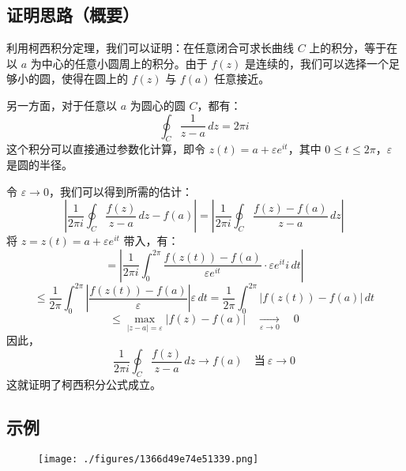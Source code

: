 \subsection{证明思路（概要）}
利用柯西积分定理，我们可以证明：在任意闭合可求长曲线 $C$ 上的积分，等于在以 $a$ 为中心的任意小圆周上的积分。由于 $f(z)$ 是连续的，我们可以选择一个足够小的圆，使得在圆上的 $f(z)$ 与 $f(a)$ 任意接近。

另一方面，对于任意以 $a$ 为圆心的圆 $C$，都有：
$$
\oint_{C} \frac{1}{z - a} \, dz = 2\pi i~
$$
这个积分可以直接通过参数化计算，即令 $z(t) = a + \varepsilon e^{it}$，其中 $0 \leq t \leq 2\pi$，$\varepsilon$ 是圆的半径。

令 $\varepsilon \to 0$，我们可以得到所需的估计：
$$
\left| \frac{1}{2\pi i} \oint_{C} \frac{f(z)}{z - a} \, dz - f(a) \right|
= \left| \frac{1}{2\pi i} \oint_{C} \frac{f(z) - f(a)}{z - a} \, dz \right|~
$$
将 $z = z(t) = a + \varepsilon e^{it}$ 带入，有：
$$
= \left| \frac{1}{2\pi i} \int_0^{2\pi} \frac{f(z(t)) - f(a)}{\varepsilon e^{it}} \cdot \varepsilon e^{it} i \, dt \right|~
$$
$$
\leq \frac{1}{2\pi} \int_0^{2\pi} \left| \frac{f(z(t)) - f(a)}{\varepsilon} \right| \varepsilon \, dt
= \frac{1}{2\pi} \int_0^{2\pi} |f(z(t)) - f(a)| \, dt~
$$
$$
\leq \max_{|z - a| = \varepsilon} |f(z) - f(a)| \quad \xrightarrow[\varepsilon \to 0]{} \quad 0~
$$
因此，
$$
\frac{1}{2\pi i} \oint_{C} \frac{f(z)}{z - a} \, dz \to f(a) \quad \text{当}~ \varepsilon \to 0~
$$
这就证明了柯西积分公式成立。
\subsection{示例}
\begin{figure}[ht]
\centering
\texttt{[image: ./figures/1366d49e74e51339.png]}
\caption{} \label{fig_KXjfgs_1}
\end{figure}